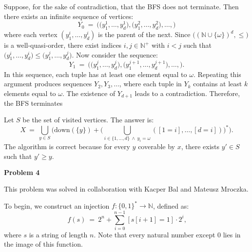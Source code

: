 \documentclass[12pt]{article}
\begin{document}
	\medskip
	
	Suppose, for the sake of contradiction, that the BFS does not terminate.
	Then there exists an infinite sequence of vertices:
	\[ Y_{0} \ = \ \big( \big( y_{1}^{1}, \ldots, y_{d}^{1} \big), \big(
	y_{1}^{2}, \ldots, y_{d}^{2} \big), \ldots, \big) \]
	where each vertex \((y_{1}^{i}, \ldots, y_{d}^{i})\) is the parent of the
	next. Since \(\big( (\mathbb{N} \cup \{\omega\})^{d}, \leqslant \big)\) is a
	well-quasi-order, there exist indices \(i, j \in \mathbb{N}^{+}\) with \(i <
	j\) such that \(\big( y_{1}^{i}, \ldots, y_{d}^{i} \big) \leqslant \big(
	y_{1}^{j}, \ldots, y_{d}^{j} \big)\). Now consider the sequence:
	\[ Y_{1} \ = \ \big( \big( y_{1}^{j}, \ldots, y_{d}^{j} \big), \big(
	y_{1}^{j + 1}, \ldots, y_{d}^{j + 1} \big), \ldots, \big) \text{.} \]
	In this sequence, each tuple has at least one element equal to \(\omega\).
	Repeating this argument produces sequences \(Y_{2}, Y_{3}, \ldots\), where
	each tuple in \(Y_{k}\) contains at least \(k\) elements equal to
	\(\omega\). The existence of \(Y_{d + 1}\) leads to a contradiction.
	Therefore, the BFS terminates
	
	\medskip
	
	Let \(S\) be the set of visited vertices. The answer is:
	\[ X \ = \ \bigcup_{y \in S} \Bigg( \text{down}(\{y\}) + \Bigg( \bigcup_{i
	\in \{1, \ldots, d\} \ \wedge \ y_{i} = \omega} ([1 = i], \ldots, [d = i])
	\Bigg)^{\ast} \Bigg) \text{.} \]
	The algorithm is correct because for every \(y\) coverable by \(x\), there
	exists \(y' \in S\) such that \(y' \geqslant y\).
	
	\bigskip
	
	\textbf{Problem 4}
	
	\medskip
	
	This problem was solved in collaboration with Kacper Bal and Mateusz
	Mroczka.
	
	\medskip
	
	To begin, we construct an injection \(f : \{0, 1\}^{\ast} \to \mathbb{N}\),
	defined as:
	\[ f(s) \ = \ 2^{n} + \sum\limits_{i = 0}^{n - 1} [s[i + 1] = 1] \cdot 2^{i}
	\text{,} \]
	where \(s\) is a string of length \(n\). Note that every natural number
	except \(0\) lies in the image of this function.
	
	\medskip
	
\end{document}
